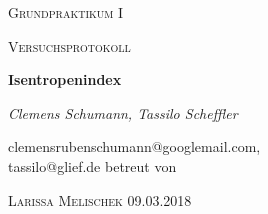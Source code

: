\documentclass[11pt,a4paper]{article}
\begin{document}
   \begin{center}
    {\scshape\LARGE Grundpraktikum I \par}
    \vspace{1cm}
    {\scshape\Large Versuchsprotokoll\par}
    \vspace{1.5cm}
    {\huge\bfseries Isentropenindex\par}
    \vspace{2cm}
       {\large \itshape{Clemens Schumann, Tassilo Scheffler}\/ \par}
    \vspace{0.5cm}
    {clemensrubenschumann@googlemail.com, \\ tassilo@glief.de}
    \vfill
    betreut von\par
    \textsc{Larissa Melischek}
    \vfill
    {\Large 09.03.2018}
 
   \end{center}
 \thispagestyle{empty}
 \newpage
 \setcounter{page}{1}
 \tableofcontents
 \newpage
\end{document}
